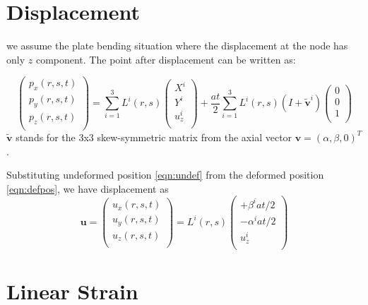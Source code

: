 \documentclass{article}
\begin{document}
\section{Displacement}

we assume the plate bending situation where the displacement at the node has only $z$ component. The point after displacement can be written as:

\begin{equation}
\left(\begin{array}{l} p_x(r,s,t)\\ p_y(r,s,t)\\ p_z(r,s,t)\\ \end{array}\right)
 = \sum_{i=1}^3L^i(r,s)
\left(\begin{array}{l} X^i\\ Y^i\\ u_z^i\\ \end{array}\right)
 + \frac{at}{2} \sum^{3}_{i=1} L^i(r,s) 
  (I+\tilde{\textbf{v}}^i)
\left(\begin{array}{l} 0\\ 0\\ 1\\ \end{array}\right)
\label{eqn:defpos}
\end{equation}
%
$\tilde{\textbf{v}}$ stands for the 3x3 skew-symmetric matrix from the axial vector $\textbf{v}=\left(\alpha,\beta,0\right)^T$.


Substituting undeformed position \eqref{eqn:undef} from the deformed position \eqref{eqn:defpos}, we have displacement as
%
\begin{equation}
\textbf{u}=\left(\begin{array}{l} u_x(r,s,t)\\ u_y(r,s,t)\\ u_z(r,s,t)\\ \end{array}\right)
 = 
 L^i(r,s) 
\left(\begin{array}{c} 
+\beta^i at/2\\ -\alpha^iat/2 \\ u^i_z\\ \end{array}\right)
\label{eqn:deformation}
\end{equation}



\section{Linear Strain}
\end{document}
